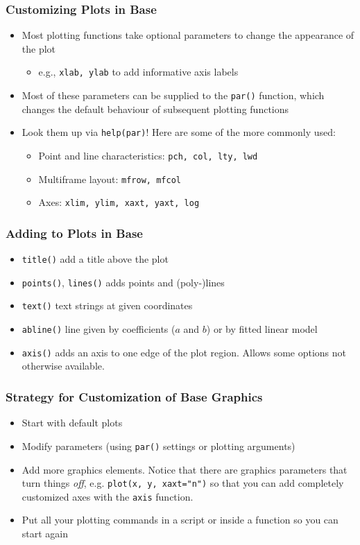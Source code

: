 \documentclass[xcolor=svgnames]{beamer}
\newcommand{\code}[1]{\texttt{#1}}
\begin{document}
\begin{frame}
  \frametitle{Customizing Plots in Base}
  \begin{itemize}
  \item Most plotting functions take optional parameters to change the
    appearance of the plot
    \begin{itemize}
    \item e.g., \code{xlab, ylab} to add informative axis labels
    \end{itemize}
  \item Most of these parameters can be supplied to the \code{par()}
    function, which changes the default behaviour of subsequent
    plotting functions
  \item Look them up via \code{help(par)}! Here are some of the more
    commonly used:
    \begin{itemize}
    \item Point and line characteristics: \code{pch, col, lty, lwd}
    \item Multiframe layout: \code{mfrow, mfcol}
    \item Axes: \code{xlim, ylim, xaxt, yaxt, log}
    \end{itemize}
  \end{itemize}
\end{frame}

\begin{frame}
  \frametitle{Adding to Plots in Base}
    \begin{itemize}
    \item \code{title()} add a title above the plot
    \item \code{points()}, \code{lines()} adds points and (poly-)lines
    \item \code{text()} text strings at given coordinates
    \item \code{abline()} line given by coefficients ($a$ and $b$) or
      by fitted linear model
    \item \code{axis()} adds an axis to one edge of the plot region.
      Allows some options not otherwise available.
    \end{itemize}
\end{frame}

\begin{frame}
  \frametitle{Strategy for Customization of Base Graphics}
  \begin{itemize}
  \item Start with default plots
  \item Modify parameters (using \code{par()} settings or plotting
      arguments)
  \item Add more graphics elements. Notice that there are graphics
      parameters that turn things \emph{off}, e.g.
      \code{plot(x, y, xaxt="n")} so that you can add
      completely customized axes with the \code{axis} function.
  \item Put all your plotting commands in a script or inside a function
      so you can start again
  \end{itemize}
\end{frame}
\end{document}
